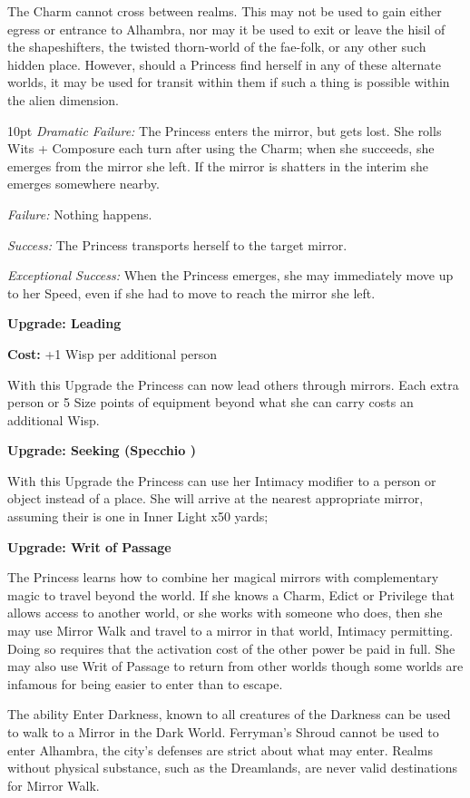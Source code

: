 The Charm cannot cross between realms. This may not be used to gain either egress or entrance to Alhambra, nor may it be used to exit or leave the hisil of the shapeshifters, the twisted thorn-world of the fae-folk, or any other such hidden place. However, should a Princess find herself in any of these alternate worlds, it may be used for transit within them if such a thing is possible within the alien dimension.

\begin{myindentpar}{10pt}    \emph{Dramatic Failure:} The Princess enters the mirror, but gets lost. She rolls Wits + Composure each turn after using the Charm; when she succeeds, she emerges from the mirror she left. If the mirror is shatters in the interim she emerges somewhere nearby. 
    
	\emph{Failure:} Nothing happens.
    
	\emph{Success:} The Princess transports herself to the target mirror.
    
	\emph{Exceptional Success:} When the Princess emerges, she may immediately move up to her Speed, even if she had to move to reach the mirror she left.

\textbf{Upgrade: Leading}

\noindent \textbf{Cost:} +1 Wisp per additional person

With this Upgrade the Princess can now lead others through mirrors. Each extra person or 5 Size points of equipment beyond what she can carry costs an additional Wisp.

\textbf{Upgrade: Seeking (Specchio \textbullet\textbullet\textbullet)}

With this Upgrade the Princess can use her Intimacy modifier to a person or object instead of a place. She will arrive at the nearest appropriate mirror, assuming their is one in Inner Light x50 yards;  

\textbf{Upgrade: Writ of Passage}

The Princess learns how to combine her magical mirrors with complementary magic to travel beyond the world. If she knows a Charm, Edict or Privilege that allows access to another world, or she works with someone who does, then she may use Mirror Walk and travel to a mirror in that world, Intimacy permitting. Doing so requires that the activation cost of the other power be paid in full. She may also use Writ of Passage to return from other worlds \textendash though some worlds are infamous for being easier to enter than to escape. 

The ability Enter Darkness, known to all creatures of the Darkness can be used to walk to a Mirror in the Dark World. Ferryman's Shroud cannot be used to enter Alhambra, the city's defenses are strict about what may enter. Realms without physical substance, such as the Dreamlands, are never valid destinations for Mirror Walk.

\end{myindentpar}

